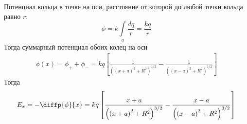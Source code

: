 \documentclass[a4paper,14pt]{extarticle}
\begin{document}
Потенциал кольца в точке на оси, расстояние от которой до любой точки кольца равно $r$:
\begin{equation}
	\phi=k\int\limits_{q} \frac{dq}{r}=\frac{kq}{r}
\end{equation}
Тогда суммарный потенциал обоих колец на оси
\begin{align}
	\phi(x)=\phi_++\phi_-
	=
	kq
	\left[	
	\frac{1}{
		\left(
			\left(x+a\right)^2+R^2
		\right)^{1/2}
	}
	-
	\frac{1}{
		\left(
			\left(x-a\right)^2+R^2
		\right)^{1/2}
	}	
	\right]
\end{align}
Тогда
\begin{equation}
	E_x=-\diffp{\phi}{x}
	=
	kq
	\left[	
	\frac{x+a}{
		\left(
			\left(x+a\right)^2+R^2
		\right)^{3/2}
	}
	-
	\frac{x-a}{
		\left(
			\left(x-a\right)^2+R^2
		\right)^{3/2}
	}	
	\right]
\end{equation}
\end{document}
